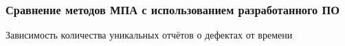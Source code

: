 \documentclass[10pt,gray]{beamer}
\begin{document}

\begin{frame}
\frametitle{Сравнение методов МПА с использованием разработанного ПО}
Зависимость количества уникальных отчётов о дефектах от времени
\begin{figure}[h]
  \begin{minipage}[h]{0.49\linewidth}
  \end{minipage}
  \hfill
  \begin{minipage}[h]{0.49\linewidth}
  \end{minipage}
\end{figure}
\end{frame}
\end{document}
